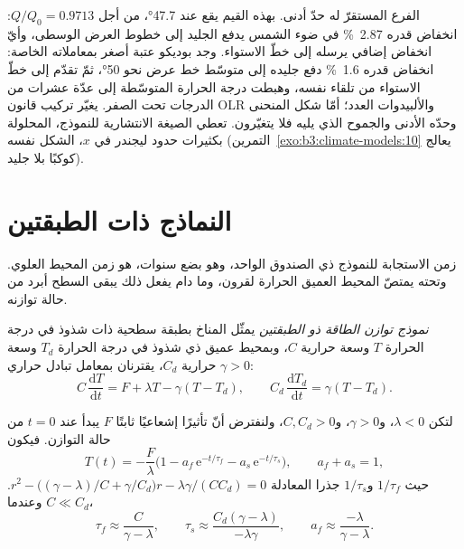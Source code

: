 الفرع المستقرّ له حدّ أدنى. بهذه القيم يقع عند \ang{47.7}،
من أجل $Q/Q_0 = \num{0.9713}$: انخفاض قدره \qty{2.87}{\percent} في ضوء الشمس
يدفع الجليد إلى خطوط العرض الوسطى، وأيّ انخفاض إضافي يرسله إلى
خطّ الاستواء. وجد بوديكو عتبة أصغر بمعاملاته الخاصة: انخفاض قدره
\qty{1.6}{\percent} دفع جليده إلى متوسّط خط عرض نحو
\ang{50}، ثمّ تقدّم إلى خطّ الاستواء من تلقاء نفسه، وهبطت درجة الحرارة المتوسّطة
إلى عدّة عشرات من الدرجات تحت الصفر. يغيّر تركيب قانون OLR
والألبيدوات العدد؛ أمّا شكل المنحنى وحدّه الأدنى والجموح الذي
يليه فلا يتغيّرون. تعطي الصيغة الانتشارية للنموذج، المحلولة بكثيرات
حدود ليجندر في $x$، الشكل نفسه (التمرين~\ref{exo:b3:climate-models:10}
يعالج كوكبًا بلا جليد).

\section{النماذج ذات الطبقتين}\label{sec:b3:climate-models:two-layer}

زمن الاستجابة للنموذج ذي الصندوق الواحد، وهو بضع سنوات، هو زمن المحيط العلوي.
وتحته يمتصّ المحيط العميق الحرارة لقرون، وما دام يفعل ذلك
يبقى السطح أبرد من حالة توازنه.

\begin{definition}\label{def:b3:climate-models:two-layer}
\emph{نموذج توازن الطاقة ذو الطبقتين}
يمثّل المناخ بطبقة سطحية ذات شذوذ في درجة الحرارة $T$
وسعة حرارية $C$، وبمحيط عميق ذي شذوذ في درجة الحرارة $T_d$
وسعة حرارية $C_d$، يقترنان بمعامل تبادل حراري $\gamma > 0$:
\[
C\,\frac{\mathrm dT}{\mathrm dt} = F + \lambda T - \gamma(T - T_d), \qquad
C_d\,\frac{\mathrm dT_d}{\mathrm dt} = \gamma(T - T_d) .
\]
\end{definition}

\begin{theorem}\label{thm:b3:climate-models:two-layer}
لتكن $\lambda < 0$، و$\gamma > 0$، و$C, C_d > 0$، ولنفترض أنّ تأثيرًا إشعاعيًا ثابتًا
$F$ يبدأ عند $t = 0$ من حالة التوازن. فيكون
\[
T(t) = -\frac{F}{\lambda}\Big(1 - a_f\,\mathrm e^{-t/\tau_f} - a_s\,\mathrm
e^{-t/\tau_s}\Big), \qquad a_f + a_s = 1 ,
\]
حيث $1/\tau_f$ و$1/\tau_s$ جذرا المعادلة $r^2 - \big((\gamma -
\lambda)/C + \gamma/C_d\big)r - \lambda\gamma/(CC_d) = 0$. وعندما $C \ll C_d$،
\[
\tau_f \approx \frac{C}{\gamma - \lambda}, \qquad
\tau_s \approx \frac{C_d(\gamma - \lambda)}{-\lambda\gamma}, \qquad
a_f \approx \frac{-\lambda}{\gamma - \lambda} .
\]
\end{theorem}

